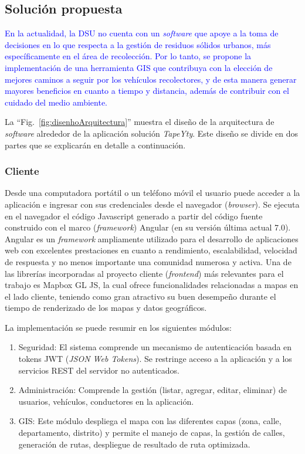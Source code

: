 \documentclass[spanish, conference]{IEEEtran}
\begin{document}
{\subsection{Solución propuesta}

\textcolor{blue}{En la actualidad, la DSU no cuenta con un \textit{software} que apoye a la toma de decisiones en lo que respecta a la gestión de residuos sólidos urbanos, más específicamente en el área de recolección. Por lo tanto, se propone la implementación de una herramienta GIS que contribuya con la elección de mejores caminos a seguir por los vehículos recolectores, y de esta manera generar mayores beneficios en cuanto a tiempo y distancia, además de contribuir con el cuidado del medio ambiente.}

La ``Fig.~\ref{fig:disenhoArquitectura}'' muestra el diseño de la arquitectura de \textit{software} alrededor de la aplicación solución \textit{TapeYty}. Este diseño se divide en dos partes que se explicarán en detalle a continuación.

\subsubsection{Cliente}

Desde una computadora portátil o un teléfono móvil el usuario puede acceder a la aplicación e ingresar con sus credenciales desde el navegador (\textit{browser}). Se ejecuta en el navegador el código Javascript generado a partir del código fuente construido con el marco (\textit{framework}) Angular (en su versión última actual 7.0). Angular es un \textit{framework} ampliamente utilizado para el desarrollo de aplicaciones web con excelentes prestaciones en cuanto a rendimiento, escalabilidad, velocidad de respuesta y no menos importante una comunidad numerosa y activa. Una de las librerías incorporadas al proyecto cliente (\textit{frontend}) más relevantes para el trabajo es Mapbox GL JS, la cual ofrece funcionalidades relacionadas a mapas en el lado cliente, teniendo como gran atractivo su buen desempeño durante el tiempo de renderizado de los mapas y datos geográficos.

La implementación se puede resumir en los siguientes módulos:
\begin{enumerate}
    \item Seguridad: El sistema comprende un mecanismo de autenticación basada en tokens JWT (\textit{JSON Web Tokens}). Se restringe acceso a la aplicación y a los servicios REST del servidor no autenticados.
    \item Administración: Comprende la gestión (listar, agregar, editar, eliminar) de usuarios, vehículos, conductores en la aplicación.
    \item GIS: Este módulo despliega el mapa con las diferentes capas (zona, calle, departamento, distrito) y permite el manejo de capas, la gestión de calles, generación de rutas, despliegue de resultado de ruta optimizada.
\end{enumerate}

}
\end{document}
